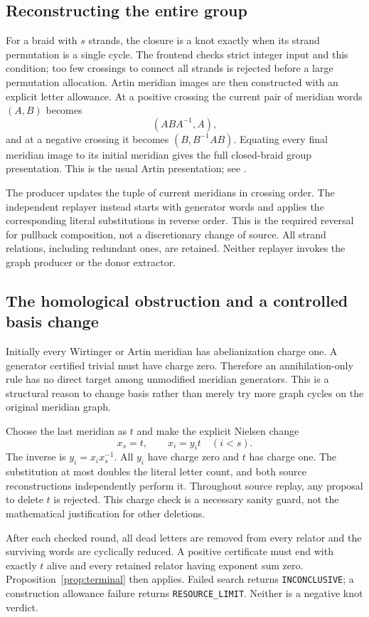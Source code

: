 \documentclass[11pt]{article}
\theoremstyle{definition}\newtheorem{definition}[theorem]{Definition}
\theoremstyle{remark}\newtheorem{remark}[theorem]{Remark}
\newcommand{\code}[1]{\texttt{#1}}
\begin{document}
\subsection{Reconstructing the entire group}
For a braid with $s$ strands, the closure is a knot exactly when its strand
permutation is a single cycle. The frontend checks strict integer input
and this condition; too few crossings to connect all strands is rejected
before a large permutation allocation. Artin meridian images are then
constructed with an explicit letter allowance. At a positive crossing the
current pair of meridian words $(A,B)$ becomes
\[
 (ABA^{-1},A),
\]
and at a negative crossing it becomes $(B,B^{-1}AB)$. Equating every final
meridian image to its initial meridian gives the full closed-braid group
presentation. This is the usual Artin presentation; see
\cite[Theorem 1.1 and Definition 3.1]{Gemein}.

The producer updates the tuple of current meridians in crossing order.
The independent replayer instead starts with generator words and applies
the corresponding literal substitutions in reverse order. This is the
required reversal for pullback composition, not a discretionary change
of source. All strand relations, including redundant ones, are retained.
Neither replayer invokes the graph producer or the donor extractor.

\subsection{The homological obstruction and a controlled basis change}
\label{sec:homologybarrier}
Initially every Wirtinger or Artin meridian has abelianization charge one.
A generator certified trivial must have charge zero. Therefore an
annihilation-only rule has no direct target among unmodified meridian
generators. This is a structural reason to change basis rather than merely
try more graph cycles on the original meridian graph.

Choose the last meridian as $t$ and make the explicit Nielsen change
\[
 x_s=t,\qquad x_i=y_i t\quad(i<s).
\]
The inverse is $y_i=x_i x_s^{-1}$. All $y_i$ have charge zero and $t$ has
charge one. The substitution at most doubles the literal letter count,
and both source reconstructions independently perform it. Throughout
source replay, any proposal to delete $t$ is rejected. This charge check
is a necessary sanity guard, not the mathematical justification for
other deletions.

After each checked round, all dead letters are removed from every relator
and the surviving words are cyclically reduced. A positive certificate
must end with exactly $t$ alive and every retained relator having exponent
sum zero. Proposition~\ref{prop:terminal} then applies. Failed search
returns \code{INCONCLUSIVE}; a construction allowance failure returns
\code{RESOURCE\_LIMIT}. Neither is a negative knot verdict.
\end{document}
